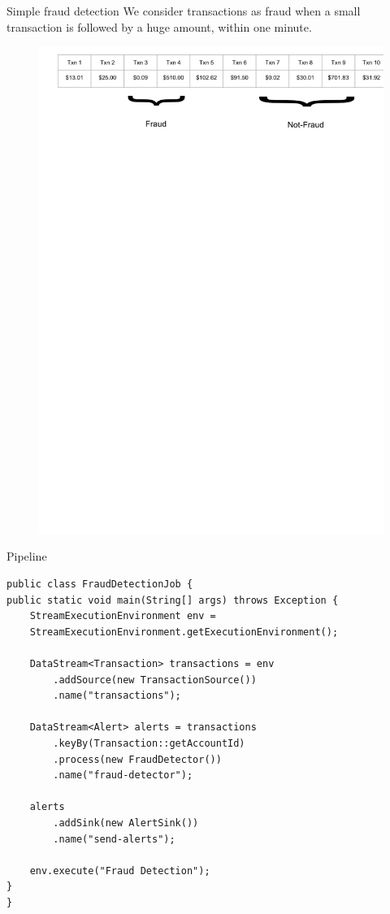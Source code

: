 \documentclass[blue]{beamer}
\begin{document}
\begin{frame}{Simple fraud detection}
We consider transactions as fraud when a small transaction is followed by a huge amount, within one minute.

\begin{figure}
        \centering
        \includegraphics[width=\textwidth]{fraud_detection.png}
        \label{fig:streamexample}
    \end{figure}
\end{frame}

\begin{frame}[fragile]{Pipeline}
\small{
\begin{lstlisting}
public class FraudDetectionJob {
public static void main(String[] args) throws Exception {
    StreamExecutionEnvironment env = 
    StreamExecutionEnvironment.getExecutionEnvironment();

    DataStream<Transaction> transactions = env
        .addSource(new TransactionSource())
        .name("transactions");
    
    DataStream<Alert> alerts = transactions
        .keyBy(Transaction::getAccountId)
        .process(new FraudDetector())
        .name("fraud-detector");

    alerts
        .addSink(new AlertSink())
        .name("send-alerts");

    env.execute("Fraud Detection");
}
}
\end{lstlisting}
}
    
\end{frame}
\end{document}
